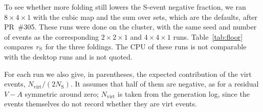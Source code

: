 To see whether more folding still lowers the S-event negative fraction, we ran
$8\times4\times1$ with the cubic map and the sum over sets, which are the defaults, after PR~\#305.
These runs were done on the cluster, with the same seed and number of events as the
corresponding $2\times2\times1$ and $4\times4\times1$ runs. Table~\ref{tab:floor} compares
$r_{\mathrm S}$ for the three foldings. The CPU of these runs is not comparable with the desktop runs
and is not quoted.

For each run we also give, in parentheses, the expected contribution of the virt events,
$N_{\mathrm{virt}}/(2N_{\mathrm S})$. It assumes that half of them are negative, as for a residual
$V-A$ symmetric around zero; $N_{\mathrm{virt}}$ is taken from the generation log, since the
events themselves do not record whether they are virt events.

\begin{table}[h]
\centering\small
{}
\caption{S-event negative fraction with the cubic map and the sum over FKS sets, for three
foldings. In parentheses: expected contribution of the virt events. $\rH$ and the total
$r$ are for the $8\times4\times1$ runs and for each folding respectively.}
\label{tab:floor}
\end{table}

